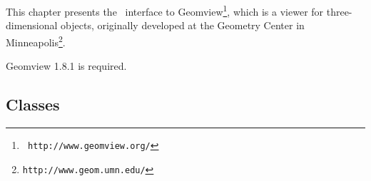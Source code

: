 
{} 

This chapter presents the \cgal\ interface to Geomview\footnote{\tt
http://www.geomview.org/}, which is a
viewer for three-dimensional objects, originally developed at the Geometry
Center in Minneapolis\footnote{\tt http://www.geom.umn.edu/}.

Geomview 1.8.1 is required.

\subsection*{Classes}
